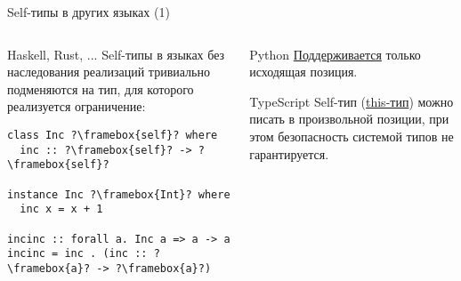 \documentclass[handout,aspectratio=169,usenames,dvipsnames]{beamer}
\begin{document}
\begin{frame}[fragile]{Self-типы в других языках (1)}
    \begin{columns}[onlytextwidth]
        \begin{column}{0.48\textwidth}
            \begin{block}{Haskell, Rust, ...}
                Self-типы в языках без наследования реализаций тривиально подменяются на тип, для которого реализуется ограничение:
                \begin{verbatim}
class Inc ?\framebox{self}? where
  inc :: ?\framebox{self}? -> ?\framebox{self}?

instance Inc ?\framebox{Int}? where
  inc x = x + 1

incinc :: forall a. Inc a => a -> a
incinc = inc . (inc :: ?\framebox{a}? -> ?\framebox{a}?)
                \end{verbatim}
            \end{block}
        \end{column}\hfill%
        \begin{column}{0.49\textwidth}
            \pause
            \begin{block}{Python}
                \href{https://peps.python.org/pep-0673/}{\color{blue}Поддерживается}
                 только исходящая позиция.
            \end{block}
            \pause
            \begin{block}{TypeScript}
                Self-тип (\href{https://www.typescriptlang.org/docs/handbook/2/classes.html\#this-types}{\color{blue}this-тип}) можно писать в произвольной позиции, при этом безопасность системой типов не гарантируется.
            \end{block}
        \end{column}
    \end{columns}
\end{frame}
\end{document}
